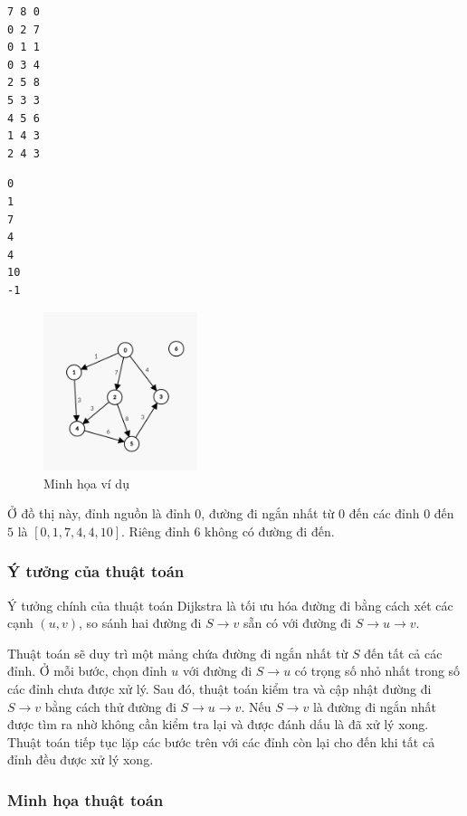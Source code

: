 \documentclass{article}
\begin{document}
\begin{lstlisting}[caption={Input}]
7 8 0
0 2 7
0 1 1
0 3 4
2 5 8
5 3 3
4 5 6
1 4 3
2 4 3
\end{lstlisting}
\begin{lstlisting}[caption={Output}]
0
1
7
4
4
10
-1
\end{lstlisting}

\begin{figure}[h]
    \centering
    \includegraphics[width=0.4\textwidth]{img/b7/dijkstra_1.png}
    \caption{Minh họa ví dụ}
\end{figure}

 Ở đồ thị này, đỉnh nguồn là đỉnh $0$, đường đi ngắn nhất từ $0$ đến các đỉnh $0$ đến $5$ là $[0, 1, 7, 4, 4, 10]$. Riêng đỉnh $6$ không có đường đi đến.

\subsubsection*{Ý tưởng của thuật toán}

Ý tưởng chính của thuật toán Dijkstra là tối ưu hóa đường đi bằng cách xét các cạnh $(u, v)$, so sánh hai đường đi $S \to v$ sẵn có với đường đi $S \to u \to v$.

Thuật toán sẽ duy trì một mảng chứa đường đi ngắn nhất từ $S$ đến tất cả các đỉnh. Ở mỗi bước, chọn đỉnh $u$ với đường đi $S \to u$ có trọng số nhỏ nhất trong số các đỉnh chưa được xử lý. Sau đó, thuật toán kiểm tra và cập nhật đường đi $S \to v$ bằng cách thử đường đi $S \to u \to v$. Nếu $S \to v$ là đường đi ngắn nhất được tìm ra nhờ không cần kiểm tra lại và được đánh dấu là đã xử lý xong. Thuật toán tiếp tục lặp các bước trên với các đỉnh còn lại cho đến khi tất cả đỉnh đều được xử lý xong.

\subsubsection*{Minh họa thuật toán}
\end{document}
